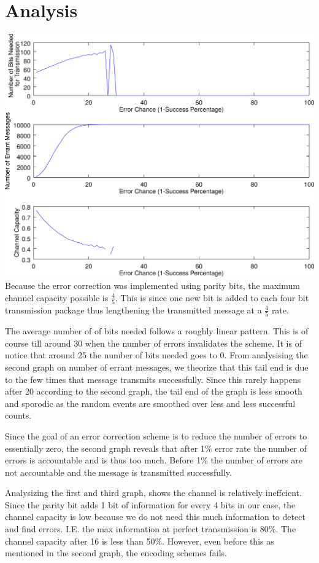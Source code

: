\documentclass{article}
\begin{document}
   \section{Analysis}
      \includegraphics[width=\textwidth]{images/polyline288.png}
      Because the error correction was implemented using parity bits,
      the maximum channel capacity possible is $\frac{4}{5}$. This is since
      one new bit is added to each four bit transmission package thus lengthening
      the transmitted message at a $\frac{4}{5}$ rate.

      The average number of of bits needed follows a roughly linear pattern. This
      is of course till around 30 when the number of errors invalidates the
      scheme. It is of notice that around 25 the number of bits needed goes to
      0. From analysising the second graph on number of errant messages, we
      theorize that this tail end is due to the few times that message transmits
      successfully. Since this rarely happens after 20 according to the second
      graph, the tail end of the graph is less smooth and sporodic as the
      random events are smoothed over less and less successful counts.

      Since the goal of an error correction scheme is to reduce the number of
      errors to essentially zero, the second graph reveals that after 1\% error
      rate the number of errors is accountable and is thus too much. Before 1\%
      the number of errors are not accountable and the message is transmitted
      successfully.

      Analysizing the first and third graph, shows the channel is relatively
      ineffcient. Since the parity bit adds 1 bit of information for every 4 bits
      in our case, the channel capacity is low because we do not need this much
      information to detect and find errors. I.E. the max information at perfect
      transmission is 80\%. The channel capacity after 16 is less than 50\%.
      However, even before this as mentioned in the second graph, the encoding
      schemes fails.
\end{document}

